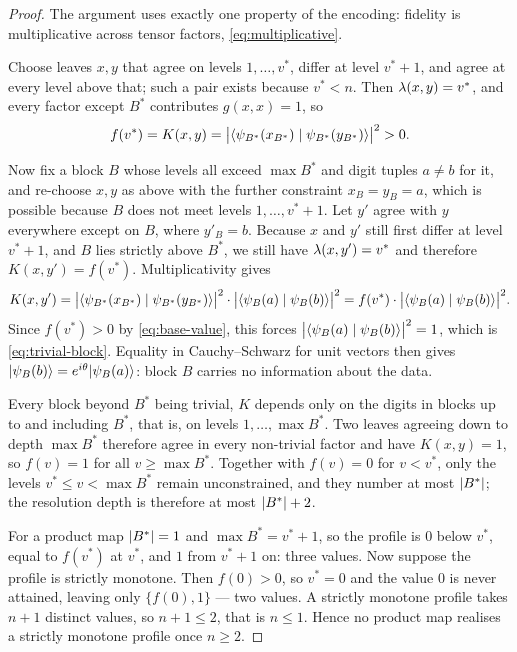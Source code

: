 \begin{proof}
  The argument uses exactly one property of the encoding: fidelity is multiplicative
  across tensor factors, \cref{eq:multiplicative}.

  Choose leaves $x, y$ that agree on levels $1, \dots, v^{*}$, differ at level
  $v^{*}+1$, and agree at every level above that; such a pair exists because
  $v^{*} < n$. Then $\lambda(x,y) = v^{*}$, and every factor except $B^{*}$
  contributes $g(x,x) = 1$, so
  \begin{equation}
    \label{eq:base-value}
    f(v^{*}) = K(x, y)
    = \bigl\lvert\langle \psi_{B^{*}}(x_{B^{*}}) \mid \psi_{B^{*}}(y_{B^{*}}) \rangle\bigr\rvert^{2} > 0 .
  \end{equation}

  Now fix a block $B$ whose levels all exceed $\max B^{*}$ and digit tuples $a \ne b$
  for it, and re-choose $x, y$ as above with the further constraint $x_B = y_B = a$,
  which is possible because $B$ does not meet levels $1, \dots, v^{*}+1$. Let $y'$
  agree with $y$ everywhere except on $B$, where $y'_B = b$. Because $x$ and $y'$ still first differ at level
  $v^{*}+1$, and $B$ lies strictly above $B^{*}$, we still have
  $\lambda(x, y') = v^{*}$ and therefore $K(x, y') = f(v^{*})$. Multiplicativity
  gives
  \begin{equation*}
    K(x, y')
    = \bigl\lvert\langle \psi_{B^{*}}(x_{B^{*}}) \mid \psi_{B^{*}}(y_{B^{*}}) \rangle\bigr\rvert^{2} \cdot
      \bigl\lvert\langle \psi_{B}(a) \mid \psi_{B}(b) \rangle\bigr\rvert^{2}
    = f(v^{*}) \cdot \bigl\lvert\langle \psi_B(a) \mid \psi_B(b) \rangle\bigr\rvert^{2} .
  \end{equation*}
  Since $f(v^{*}) > 0$ by \cref{eq:base-value}, this forces
  $\bigl\lvert\langle \psi_B(a) \mid \psi_B(b) \rangle\bigr\rvert^{2} = 1$, which is \cref{eq:trivial-block}. Equality in
  Cauchy--Schwarz for unit vectors then gives
  $\lvert \psi_B(b) \rangle = e^{i\theta}\lvert \psi_B(a) \rangle$: block $B$ carries no information
  about the data.

  Every block beyond $B^{*}$ being trivial, $K$ depends only on the digits in blocks up
  to and including $B^{*}$, that is, on levels $1, \dots, \max B^{*}$. Two leaves
  agreeing down to depth $\max B^{*}$ therefore agree in every non-trivial factor and
  have $K(x,y) = 1$, so $f(v) = 1$ for all $v \ge \max B^{*}$. Together with $f(v) = 0$
  for $v < v^{*}$, only the levels $v^{*} \le v < \max B^{*}$ remain unconstrained, and
  they number at most $\lvert B^{*}\rvert$; the resolution depth is therefore at most
  $\lvert B^{*}\rvert + 2$.

  For a product map $\lvert B^{*}\rvert = 1$ and $\max B^{*} = v^{*}+1$, so the profile is $0$
  below $v^{*}$, equal to $f(v^{*})$ at $v^{*}$, and $1$ from $v^{*}+1$ on: three
  values. Now suppose the profile is strictly monotone. Then $f(0) > 0$, so $v^{*} = 0$
  and the value $0$ is never attained, leaving only $\{f(0), 1\}$ --- two values. A
  strictly monotone profile takes $n+1$ distinct values, so $n + 1 \le 2$, that is
  $n \le 1$. Hence no product map realises a strictly monotone profile once
  $n \ge 2$.
\end{proof}

